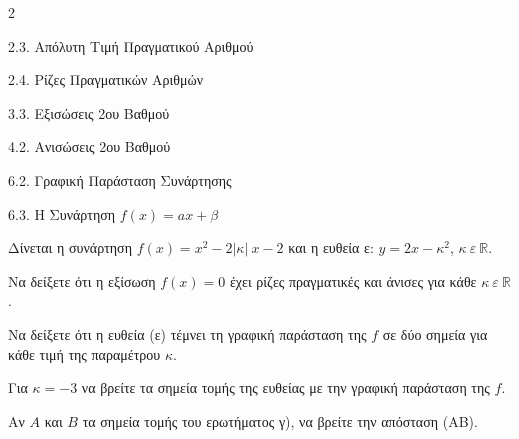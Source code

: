 \begin{ylh}{2}
    \item 2.3. Απόλυτη Τιμή Πραγματικού Αριθμού
    \item 2.4. Ρίζες Πραγματικών Αριθμών
    \item 3.3. Εξισώσεις 2ου Βαθμού
    \item 4.2. Ανισώσεις 2ου Βαθμού
    \item 6.2. Γραφική Παράσταση Συνάρτησης
    \item 6.3. Η Συνάρτηση $f(x)=ax+\beta$
\end{ylh}
Δίνεται η συνάρτηση $f(x) = x^{2} - 2|\kappa|\ x - 2$ και η ευθεία ε: $y = 2x - \kappa^{2}$, $\kappa\ \varepsilon\ \mathbb{R}$.

\begin{alist}
\item Να δείξετε ότι η εξίσωση $f(x) = 0$ έχει ρίζες πραγματικές και άνισες για κάθε $\kappa\ \varepsilon\mathbb{\ R}$.
\item Να δείξετε ότι η ευθεία (ε) τέμνει τη γραφική παράσταση της $f$ σε δύο σημεία για κάθε τιμή της παραμέτρου $\kappa.$
\item Για $\kappa= -3$ να βρείτε τα σημεία τομής της ευθείας με την γραφική παράσταση της $f$.

\item Αν $A$ και $B$ τα σημεία τομής του ερωτήματος γ), να βρείτε την απόσταση (ΑΒ).
\end{alist}

